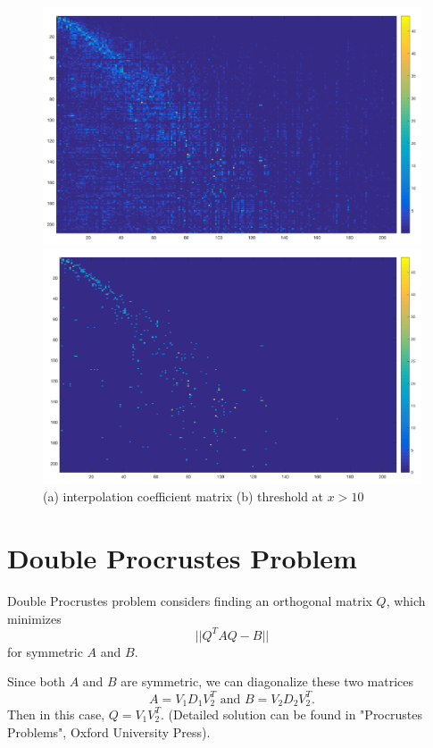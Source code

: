 \documentclass[a4paper]{article}
\begin{document}
\begin{figure}[H]
\centering
\includegraphics[width = 12 cm]{0629/coefficients_zero_diagonal_4_stages}

\includegraphics[width = 12 cm]{0629/coefficients_zero_diagonal_4_stages_threshold}

\caption{ (a) interpolation coefficient matrix (b) threshold at $x>10$ }
\end{figure}

\section{Double Procrustes Problem}

Double Procrustes problem considers finding an orthogonal matrix $Q$, which minimizes $$||Q^TAQ-B||$$ for symmetric $A$ and $B$. 

Since both $A$ and $B$ are symmetric, we can diagonalize these two matrices
$$ A = V_1D_1V_2^T\text{ and } B = V_2D_2V_2^T.$$
Then in this case, $Q = V_1 V_2^T$. (Detailed solution can be found in "Procrustes Problems", Oxford University Press). 
\end{document}
